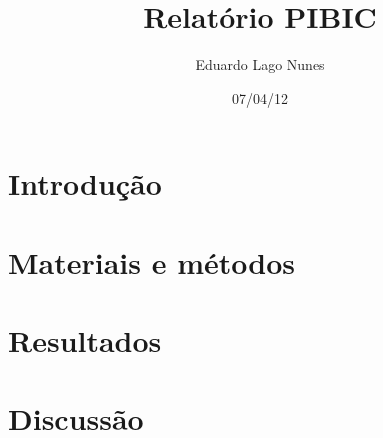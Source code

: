 \documentclass[a4paper,12pt]{article}
\author{Eduardo Lago Nunes}
\title{Relatório PIBIC}
\date{07/04/12}
\begin{document}
\maketitle

\section{Introdução}
\label{sec:introducao}

\section{Materiais e métodos}
\label{sec:materiais}

\section{Resultados}
\label{sec:resultados}

\section{Discussão}
\label{sec:discussao}
\end{document}
